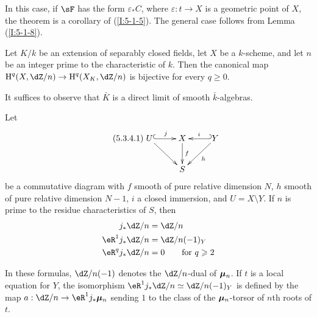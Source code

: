 In this case, if $\sF$ has the form $\varepsilon_*C$, where
$\varepsilon:t\to X$ is a geometric point of $X$, the theorem is a
corollary of (\ref{I:5-1-5}). The general case follows from Lemma
(\ref{I:5-1-8}).

\begin{corollary}\label{I:5-3-3}
Let $K/k$ be an extension of separably closed fields, let $X$ be a
$k$-scheme, and let $n$ be an integer prime to the characteristic of
$k$. Then the canonical map
$\h^q(X,\dZ/n)\to\h^q(X_K,\dZ/n)$ is bijective for every
$q\geqslant0$.
\end{corollary}

It suffices to observe that $\bar K$ is a direct limit of smooth
$\bar k$-algebras.

\begin{theorem}\label{I:5-3-4}
Let
\begin{equation*}\tag{5.3.4.1}\label{I:eq:5-3-4-1}\xymatrix{
  U \ar@{^{(}->}[r]^-j \ar[dr]
    & X \ar[d]^-f
    & \ar@{_{(}->}[l]_-i Y \ar[dl]^-h \\
  & S
}\end{equation*}
be a commutative diagram with $f$ smooth of pure relative dimension $N$,
$h$ smooth of pure relative dimension $N-1$, $i$ a closed immersion,
and $U=X\setminus Y$. If $n$ is prime to the residue characteristics of
$S$, then
\begin{equation*}
\begin{aligned}
  j_* \dZ/n     &= \dZ/n \\
  \eR^1 j_*\dZ/n &= \dZ/n(-1)_Y \\
  \eR^q j_*\dZ/n &= 0 \qquad \text{for $q\geqslant 2$}
\end{aligned}
\end{equation*}
\end{theorem}

In these formulas, $\dZ/n(-1)$ denotes the $\dZ/n$-dual of ${\bm\mu}_n$.
If $t$ is a local equation for $Y$, the isomorphism
$\eR^1j_*\dZ/n\simeq\dZ/n(-1)_Y$ is defined by the map
$a:\dZ/n\to\eR^1j_*\dmu_n$ sending $1$ to the class of the
${\bm\mu}_n$-torsor of $n$th roots of $t$.

